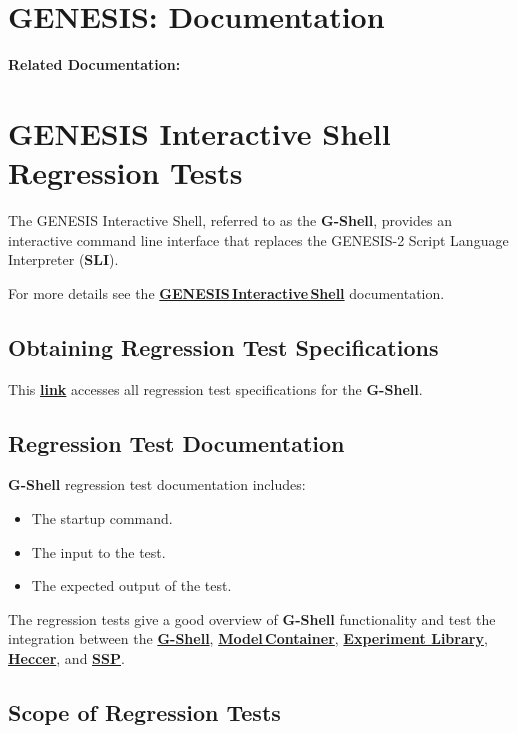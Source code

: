 \documentclass[12pt]{article}
\begin{document}
\section*{GENESIS: Documentation}

{\bf Related Documentation:}

\section*{GENESIS Interactive Shell Regression Tests}

The GENESIS Interactive Shell, referred to as the {\bf G-Shell}, provides an interactive command line interface that replaces the GENESIS-2 Script Language Interpreter ({\bf SLI}).

For more details see the \href{../gshell/gshell.tex}{\bf GENESIS\,Interactive\,Shell} documentation.

\subsection*{Obtaining Regression Test Specifications}

This \href{http://www.neurospaces.org/neurospaces_project/gshell/tests/html/specifications/main.html}{\bf link} accesses all regression test specifications for the {\bf G-Shell}.

\subsection*{Regression Test Documentation}

{\bf G-Shell} regression test documentation includes:
\begin{itemize}
\item The startup command.
\item The input to the test.
\item The expected output of the test.
\end{itemize}
The regression tests give a good overview of {\bf G-Shell} functionality and test the integration between the \href{../gshell/gshell.tex}{{\bf G-Shell}}, \href{../model-container/model-container.tex}{\bf Model\,Container}, \href{../experiment/experiment.tex}{\bf Experiment Library}, \href{../heccer/heccer.tex}{\bf Heccer}, and \href{../ssp/ssp.tex}{\bf SSP}.

\subsection*{Scope of Regression Tests}
\end{document}
